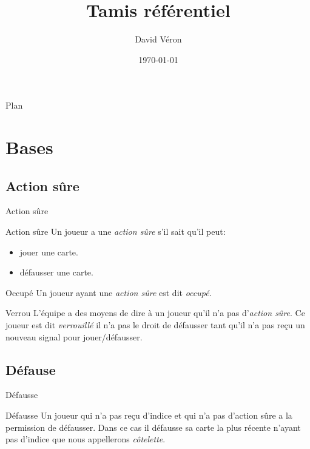 \documentclass{beamer}
\title{Tamis référentiel}
\author{David Véron}
\date{\today}
\begin{document}
\begin{frame}
    \titlepage
\end{frame}

\begin{frame}{Plan}
    \tableofcontents[hideallsubsections]
\end{frame}


\section{Bases}

\subsection{Action sûre}
\begin{frame}{Action sûre}
    \begin{block}{Action sûre}
        Un joueur a une \emph{action sûre} s'il sait qu'il peut:
        \begin{itemize}
            \item jouer une carte.
            \item défausser une carte.
        \end{itemize}
    \end{block}
    \begin{block}{Occupé}
        Un joueur ayant une \emph{action sûre} est dit \emph{occupé}.
    \end{block}
    \begin{block}{Verrou}
        L'équipe a des moyens de dire à un joueur qu'il n'a pas d'\emph{action
        sûre}. Ce joueur est dit \emph{verrouillé} il n'a pas le droit de
        défausser tant qu'il n'a pas reçu un nouveau signal pour
        jouer/défausser.
    \end{block}
\end{frame}

\subsection{Défause}
\begin{frame}{Défausse}
    \begin{block}{Défausse}
        Un joueur qui n'a pas reçu d'indice et qui n'a pas d'action sûre a la
        permission de défausser. Dans ce cas il défausse sa carte la plus
        récente n'ayant pas d'indice que nous appellerons \emph{côtelette}.
    \end{block}
\end{frame}
\end{document}
